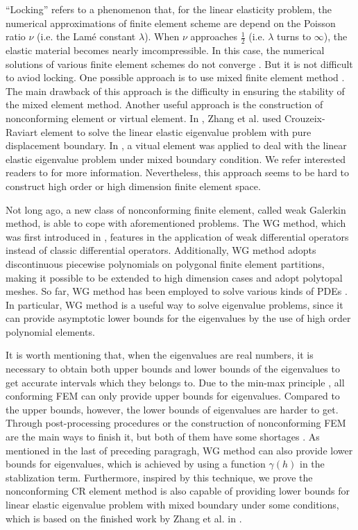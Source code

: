 \documentclass[leqno,CJK]{siamltex704}
\numberwithin{equation}{section}
\begin{document}
“Locking” refers to a phenomenon that, for the linear elasticity problem, the numerical approximations of finite element scheme are depend on the Poisson ratio $\nu$ (i.e. the Lam\'{e} constant $\lambda$). When $\nu$ approaches $\frac{1}{2}$ (i.e. $\lambda$ turns to $\infty$), the elastic material becomes nearly imcompressible. In this case, the numerical solutions of various finite element schemes do not converge \cite{Ainsworth2022,Babuska1992,Ciarlet2022,Bren1992}. But it is not difficult to aviod locking. One possible approach is to use mixed finite element method \cite{Lepe2022,Lepe2019, Meddahi2013}. The main drawback of this approach is the difficulty in ensuring the stability of the mixed element method. Another useful approach is the construction of nonconforming element or virtual element. In \cite{Bi2023}, Zhang et al. used Crouzeix-Raviart element to solve the linear elastic eigenvalue problem with pure displacement boundary. In \cite{Mora2020}, a vitual element was applied to deal with the linear elastic eigenvalue problem under mixed boundary condition. We refer interested readers to \cite{Hansbo2003,Zhang2024,Amigo2023} for more information. Nevertheless, this approach seems to be hard to construct high order or high dimension finite element space.

Not long ago, a new class of nonconforming finite element, called weak Galerkin method, is able to cope with aforementioned problems. The WG method, which was first introduced in \cite{Wang2013a}, features in the application of weak differential operators instead of classic differential operators. Additionally, WG method adopts discontinuous piecewise polynomials on polygonal finite element partitions, making it possible to be extended to high dimension cases and adopt polytopal meshes. So far, WG method has been employed to solve various kinds of PDEs \cite{Mu2013c,Zhu2014,Mu2015,Wang2014,Mu2015b,Lin2014,Chen2016c,Zhai2016}. In particular, WG method is a useful way to solve eigenvalue problems, since it can provide asymptotic lower bounds for the eigenvalues by the use of high order polynomial elements.

It is worth mentioning that, when the eigenvalues are real numbers, it is necessary to obtain both upper bounds and lower bounds of the eigenvalues to get accurate intervals which they belongs to\cite{Luo2012}. Due to the min-max principle \cite{MR1115240}, all conforming FEM can only provide upper bounds for eigenvalues. Compared to the upper bounds, however, the lower bounds of eigenvalues are harder to get. Through post-processing procedures or the construction of nonconforming FEM are the main ways to finish it, but both of them have some shortages \cite{Zhai2019}. As mentioned in the last of preceding paragragh, WG method can also provide lower bounds for eigenvalues, which is achieved by using a function $\gamma(h)$ in the stablization term. Furthermore, inspired by this technique, we prove the nonconforming CR element method is also capable of providing lower bounds for linear elastic eigenvalue problem with mixed boundary under some conditions, which is based on the finished work by Zhang et al. in \cite{Zhang2023}.
\end{document}
